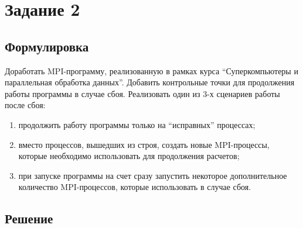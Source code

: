 \section*{Задание 2}
\subsection*{Формулировка}
Доработать MPI-программу, реализованную в рамках курса “Суперкомпьютеры и параллельная обработка данных”. Добавить контрольные точки для продолжения работы программы в случае сбоя. Реализовать один из 3-х сценариев работы после сбоя:
\begin{enumerate}
    \item продолжить работу программы только на “исправных” процессах;
    \item вместо процессов, вышедших из строя, создать новые MPI-процессы, которые необходимо использовать для продолжения расчетов;
    \item при запуске программы на счет сразу запустить некоторое дополнительное количество MPI-процессов, которые использовать в случае сбоя.
\end{enumerate}
\subsection*{Решение}

\inputminted{c}{../task-2/main.c}